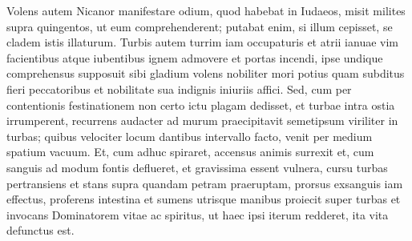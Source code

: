 \begin{biblechapter}
\begin{biblechapter}
\begin{biblechapter}
\begin{biblechapter}
\begin{biblechapter}
\begin{biblechapter}
\begin{biblechapter}
\begin{biblechapter}
\begin{biblechapter}
\begin{biblechapter}
\begin{biblechapter}
\begin{biblechapter}
\begin{biblechapter}
\begin{biblechapter}
\verse Volens autem Nicanor manifestare odium, quod habebat in Iudaeos, misit milites supra quingentos, ut eum comprehenderent; 
\verse putabat enim, si illum cepisset, se cladem istis illaturum. 
\verse Turbis autem turrim iam occupaturis et atrii ianuae vim facientibus atque iubentibus ignem admovere et portas incendi, ipse undique comprehensus supposuit sibi gladium 
\verse volens nobiliter mori potius quam subditus fieri peccatoribus et nobilitate sua indignis iniuriis affici. 
\verse Sed, cum per contentionis festinationem non certo ictu plagam dedisset, et turbae intra ostia irrumperent, recurrens audacter ad murum praecipitavit semetipsum viriliter in turbas; 
\verse quibus velociter locum dantibus intervallo facto, venit per medium spatium vacuum. 
 \verse Et, cum adhuc spiraret, accensus animis surrexit et, cum sanguis ad modum fontis deflueret, et gravissima essent vulnera, cursu turbas pertransiens et stans supra quandam petram praeruptam, 
\verse prorsus exsanguis iam effectus, proferens intestina et sumens utrisque manibus proiecit super turbas et invocans Dominatorem vitae ac spiritus, ut haec ipsi iterum redderet, ita vita defunctus est.
 

\end{biblechapter}
\end{biblechapter}
\end{biblechapter}
\end{biblechapter}
\end{biblechapter}
\end{biblechapter}
\end{biblechapter}
\end{biblechapter}
\end{biblechapter}
\end{biblechapter}
\end{biblechapter}
\end{biblechapter}
\end{biblechapter}
\end{biblechapter}
